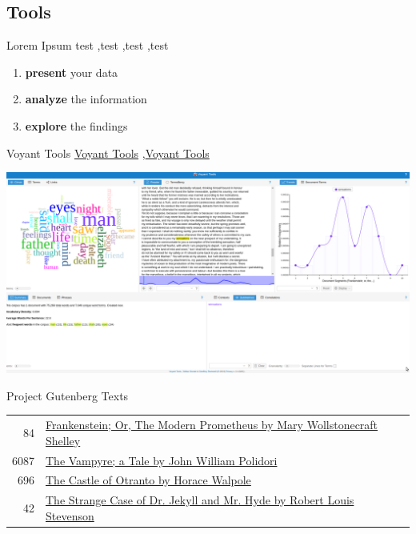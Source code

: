 \documentclass[10pt,a4paper]{article}
\begin{document}
\begin{multicols}{3}
\section{Tools}



\begin{textbox}{Lorem Ipsum}
test  \sep test \sep test \sep test

\bigskip

\begin{enumerate}
\item \textbf{present} your data
\item \textbf{analyze} the information
\item \textbf{explore} the findings
\end{enumerate}

\end{textbox}


\begin{textbox}{Voyant Tools}
 \href{https://voyant-tools.org/}{Voyant Tools} \sep \href{https://voyant-tools.org/}{Voyant Tools}

\includegraphics[width=\textwidth]{voyant.png}
\end{textbox}




\begin{textbox}{Project Gutenberg Texts}
\begin{tabular}{r|p{}}\scriptsize
    84 & \href{http://www.gutenberg.org/ebooks/84}{Frankenstein; Or, The Modern Prometheus by Mary Wollstonecraft Shelley} \\
    6087 & \href{https://www.gutenberg.org/ebooks/6087}{The Vampyre; a Tale by John William Polidori} \\
    696 & \href{https://www.gutenberg.org/ebooks/696}{The Castle of Otranto by Horace Walpole} \\
    42 & \href{https://www.gutenberg.org/ebooks/42}{The Strange Case of Dr. Jekyll and Mr. Hyde by Robert Louis Stevenson}
\end{tabular}


\end{textbox}
\end{multicols}
\end{document}
